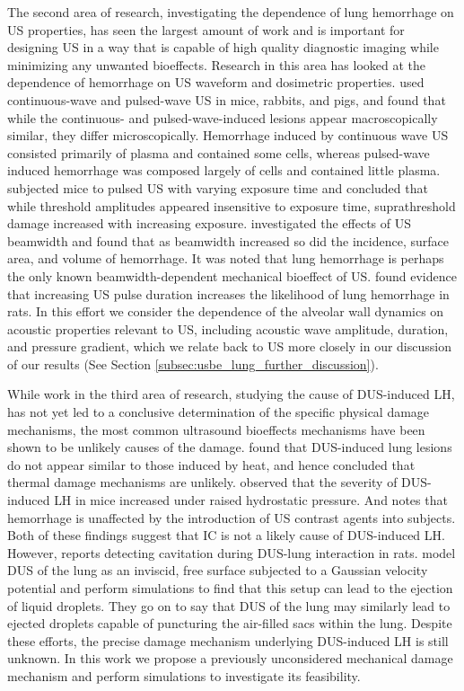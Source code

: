 The second area of research, investigating the dependence of lung
hemorrhage on \ac{US} properties, has seen the largest amount of work
and is important for designing \ac{US} in a way that is capable of
high quality diagnostic imaging while minimizing any unwanted
bioeffects. Research in this area has looked at the dependence of
hemorrhage on \ac{US} waveform and dosimetric properties.
\cite{Zachary1995a} used continuous-wave and pulsed-wave \ac{US} in
mice, rabbits, and pigs, and found that while the continuous- and
pulsed-wave-induced lesions appear macroscopically similar, they
differ microscopically.  Hemorrhage induced by continuous wave \ac{US}
consisted primarily of plasma and contained some cells, whereas
pulsed-wave induced hemorrhage was composed largely of cells and
contained little plasma. \cite{Raeman1996} subjected mice to pulsed
\ac{US} with varying exposure time and concluded that while threshold
amplitudes appeared insensitive to exposure time, suprathreshold
damage increased with increasing exposure. \cite{OBrien2001}
investigated the effects of \ac{US} beamwidth and found that as
beamwidth increased so did the incidence, surface area, and volume of
hemorrhage. It was noted that lung hemorrhage is perhaps the only
known beamwidth-dependent mechanical bioeffect of \ac{US}.
\cite{OBrien2003c} found evidence that increasing \ac{US} pulse
duration increases the likelihood of lung hemorrhage in rats. In this
effort we consider the dependence of the alveolar wall dynamics on
acoustic properties relevant to \ac{US}, including acoustic wave
amplitude, duration, and pressure gradient, which we relate back to
\ac{US} more closely in our discussion of our results (See Section
\ref{subsec:usbe_lung_further_discussion}).

While work in the third area of research, studying the cause of
\ac{DUS}-induced \ac{LH}, has not yet led to a conclusive
determination of the specific physical damage mechanisms, the most
common ultrasound bioeffects mechanisms have been shown to be unlikely
causes of the damage. \cite{Zachary2006} found that \ac{DUS}-induced
lung lesions do not appear similar to those induced by heat, and hence
concluded that thermal damage mechanisms are
unlikely. \cite{OBrien2000} observed that the severity of
\ac{DUS}-induced \ac{LH} in mice increased under raised hydrostatic
pressure. And \cite{Raeman1996} notes that hemorrhage is unaffected by
the introduction of \ac{US} contrast agents into subjects. Both of
these findings suggest that \ac{IC} is not a likely cause of
\ac{DUS}-induced \ac{LH}. However, \cite{Holland1996} reports
detecting cavitation during \ac{DUS}-lung interaction in
rats. \cite{Tjan2007,Tjan2008} model \ac{DUS} of the lung as an
inviscid, free surface subjected to a Gaussian velocity potential and
perform simulations to find that this setup can lead to the ejection
of liquid droplets. They go on to say that \ac{DUS} of the lung may
similarly lead to ejected droplets capable of puncturing the
air-filled sacs within the lung. Despite these efforts, the precise
damage mechanism underlying \ac{DUS}-induced \ac{LH} is still
unknown. In this work we propose a previously unconsidered mechanical
damage mechanism and perform simulations to investigate its
feasibility.

